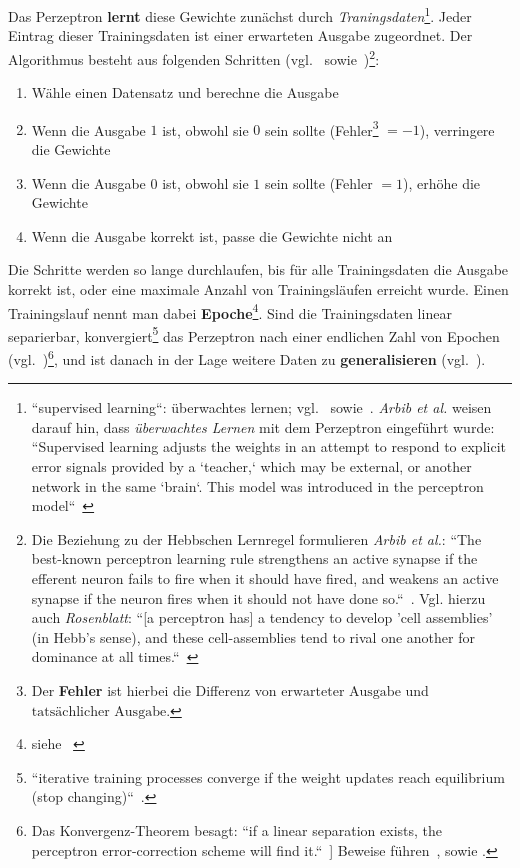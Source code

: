 Das Perzeptron \textbf{lernt} diese Gewichte zunächst durch \textit{Traningsdaten}\footnote{
    ``supervised learning``: überwachtes lernen; vgl.~\cite[811]{RN09} sowie~\cite[15]{Fau94}. \textit{Arbib et al.} weisen darauf hin, dass \textit{überwachtes Lernen} mit dem Perzeptron eingeführt wurde: ``Supervised learning adjusts the weights in an attempt to respond to explicit error signals provided by a `teacher,` which may be external, or another network in the same `brain`. This model was introduced in the perceptron model``~\cite[30]{Arb03}
}.
Jeder Eintrag dieser Trainingsdaten ist einer erwarteten Ausgabe zugeordnet. Der Algorithmus besteht aus folgenden Schritten (vgl.~\cite[65]{RM87} sowie~\cite[842]{RN09})\footnote{
    Die Beziehung zu der Hebbschen Lernregel formulieren \textit{Arbib et al.}:
        ``The best-known perceptron learning rule strengthens an active synapse if the efferent neuron fails to fire when it should have fired, and weakens an active synapse if the neuron fires when it should not have done so.``~\cite[20]{Arb03}.
        Vgl. hierzu auch \textit{Rosenblatt}: ``[a perceptron has] a tendency to develop 'cell assemblies' (in Hebb's sense), and these cell-assemblies tend to rival one another for dominance at all times.``~\cite[464]{Ros62}
}:



\begin{enumerate}
    \item Wähle einen Datensatz und berechne die Ausgabe
    \item Wenn die Ausgabe $1$ ist, obwohl sie $0$ sein sollte (Fehler\footnote{
    Der \textbf{Fehler} ist hierbei die Differenz von $\text{erwarteter Ausgabe}$ und $\text{tatsächlicher Ausgabe}$.
    } $=-1$), verringere die Gewichte
    \item Wenn die Ausgabe $0$ ist, obwohl sie $1$ sein sollte  (Fehler $=1$), erhöhe die Gewichte
    \item Wenn die Ausgabe korrekt ist, passe die Gewichte nicht an
\end{enumerate}

\noindent


\noindent
Die Schritte werden so lange durchlaufen, bis für alle Trainingsdaten die Ausgabe korrekt ist, oder eine maximale Anzahl von Trainingsläufen erreicht wurde.
Einen Trainingslauf nennt man dabei \textbf{Epoche}\footnote{siehe ~\cite[436]{Fau94}}.
Sind die Trainingsdaten linear separierbar, {konvergiert}\footnote{
    ``iterative training processes converge if the weight updates reach equilibrium (stop changing)``~\cite[425 ``Convergence``]{Fau94}.
} das Perzeptron nach einer endlichen Zahl von Epochen (vgl.~\cite[164]{MP88})\footnote{
    Das Konvergenz-Theorem besagt: ``if a linear separation exists, the perceptron error-correction scheme will find it.``~\cite[20]{Arb03}] Beweise führen~\cite[111 ff.]{Ros62}, \cite[168 ff.]{MP88} sowie \cite{Nov62}.
}, und ist danach in der Lage weitere Daten zu \textbf{generalisieren} (vgl.~\cite[202]{Ert21a}).\\

